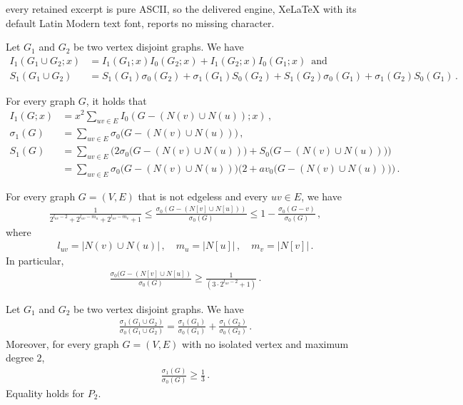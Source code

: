 \documentclass[10pt,a4paper]{amsart}
\begin{document}
every retained excerpt is pure ASCII, so the delivered engine, XeLaTeX with its default Latin Modern text font, reports no missing character.
\begin{lemma}\label{G1UnionG2}
Let $G_1$ and $G_2$ be two vertex disjoint graphs. We have
\begin{align}
\label{Eq:Er1}
  I_1(G_1 \cup G_2;x)&=I_1(G_1;x)I_0(G_2;x)+I_1(G_2;x)I_0(G_1;x)\,\text{ and }\\
  \label{Eq:Er2}
 S_1(G_1 \cup G_2)&=S_1(G_1)\sigma_0(G_2)+\sigma_1(G_1)S_0(G_2) + S_1(G_2)\sigma_0(G_1)+\sigma_1(G_2)S_0(G_1)  \,.
\end{align}
\end{lemma}

\begin{lemma}\label{av1Exp}
For every graph $G$, it holds that
\begin{align*}
I_1(G;x)&=x^2 \sum_{uv \in E} I_0(G-(N(v) \cup N(u)); x)\,,\\
\sigma_1(G)&=\sum_{uv \in E} \sigma_0\big(G-(N(v) \cup N(u))\big)\,,\\
S_1(G)&=\sum_{uv \in E} \Big(2\sigma_0\big(G-(N(v) \cup N(u))\big) +S_0\big(G-(N(v) \cup N(u))\big) \Big)\\
&=\sum_{uv \in E} \sigma_0\big(G-(N(v) \cup N(u))\big)\Big(2 +av_0\big(G-(N(v) \cup N(u))\big) \Big)\,.
\end{align*}
\end{lemma}

\begin{lemma}\label{lem:help}
For every graph $G=(V,E)$ that is not edgeless and every $uv \in E$, we have 
\begin{align*}
\frac{1}{2^{l_{uv}-2}+2^{l_{uv}-m_u}+2^{l_{uv}-m_v}+1}\leq \frac{\sigma_0(G-(N[v]\cup N[u]))}{\sigma_0(G)}\leq 1- \frac{\sigma_0(G-v)}{\sigma_0(G)}\,,
\end{align*}
where
\begin{align*}
l_{uv}=|N(v)\cup N(u)|\,, \quad m_u=|N[u]|\,, \quad m_v=| N[v]|\,.
\end{align*}
In particular, 
\begin{align*}
\frac{\sigma_0(G-(N[v]\cup N[u])}{\sigma_0(G)}\geq \frac{1}{(3\cdot 2^{l_{uv}-2}+1)}\,.
\end{align*}

\end{lemma}

\begin{proposition}\label{prop:1sur3}
Let $G_1$ and $G_2$ be two vertex disjoint graphs. We have
\begin{align*}
\frac{ \sigma_1(G_1 \cup G_2)}{ \sigma_0(G_1 \cup G_2)}=\frac{ \sigma_1(G_1)}{ \sigma_0(G_1)}+\frac{ \sigma_1(G_2)}{ \sigma_0(G_2)}\,.
\end{align*}
Moreover, for every graph $G=(V,E)$ with no isolated vertex and maximum degree $2$,
\begin{align*}
\frac{\sigma_1(G)}{\sigma_0(G)}\geq \frac{1}{3}\,.
\end{align*}
Equality holds for $P_2$.
\end{proposition}
\end{document}
